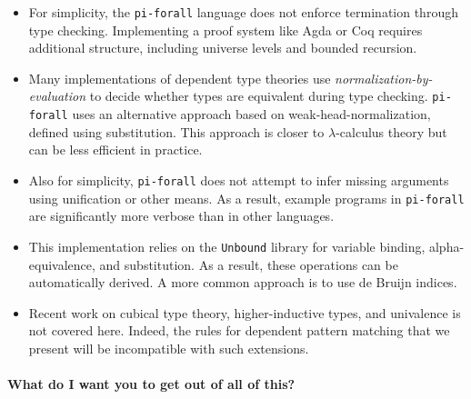 \documentclass{article}
\newcommand\pif{\texttt{pi-forall}\xspace}
\newcommand\unbound{\texttt{Unbound}\xspace}
\theoremstyle{definition}
\begin{document}
\begin{itemize}
\item For simplicity, the \pif language does not enforce termination through
  type checking. Implementing a proof system like Agda or Coq requires
  additional structure, including universe levels and bounded recursion.
\item Many implementations of dependent type theories use
  \emph{normalization-by-evaluation} to decide whether types are equivalent
  during type checking.  \pif uses an alternative approach based on
  weak-head-normalization, defined using substitution. This approach is closer
  to $\lambda$-calculus theory but can be less efficient in practice.
\item Also for simplicity, \pif does not attempt to infer missing arguments using
  unification or other means. As a result, example programs in \pif are
  significantly more verbose than in other languages.
\item This implementation relies on the \unbound library for variable binding,
  alpha-equivalence, and substitution. As a result, these operations can be
  automatically derived. A more common approach is to use de Bruijn indices.
\item Recent work on cubical type theory, higher-inductive types, and
  univalence is not covered here. Indeed, the rules for dependent pattern matching
  that we present will be incompatible with such extensions.
\end{itemize}

\paragraph{What do I want you to get out of all of this?}
\end{document}
